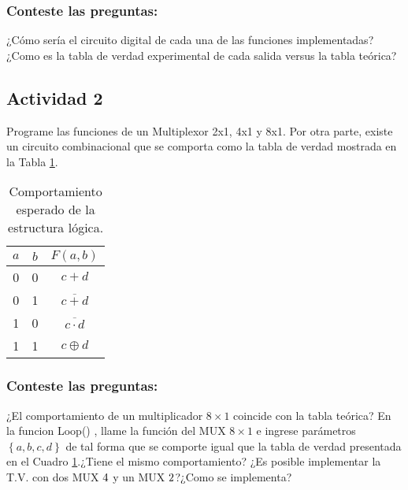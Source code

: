 \subsubsection{Conteste las preguntas:}

¿Cómo sería el circuito digital de cada una de las funciones implementadas?
¿Como es la tabla de verdad experimental de cada salida versus la tabla teórica?


\subsection{Actividad 2}

Programe las funciones de un Multiplexor 2x1, 4x1 y 8x1.
Por otra parte, existe un circuito  combinacional que se comporta como la tabla de verdad mostrada en la Tabla \ref{tab:tv}.

\begin{table}[H]
\centering
\caption{Comportamiento esperado de la estructura lógica.}
\label{tab:tv}
\begin{tabular}{ccc}
    \toprule 
    $a$ & $b$ & $F(a,b)$ \\ 
    \midrule
    0 & 0 & $c + d$ \\ 
    0 & 1 & $\overline{c + d}$ \\ 
    1 & 0 & $\overline{c \cdot d}$ \\ 
    1 & 1 & $c \oplus d$ \\ 
    \bottomrule
\end{tabular} 

\end{table}

\subsubsection{Conteste las preguntas:}

¿El comportamiento de un multiplicador $8 \times 1$ coincide con la tabla teórica?
En la funcion Loop() , llame la función del MUX  $8 \times 1$ e ingrese parámetros $\left\lbrace a,b,c,d \right\rbrace $ de tal forma que se comporte igual que la tabla de verdad presentada en el Cuadro \ref{tab:tv}.¿Tiene el mismo comportamiento?
¿Es posible implementar la T.V. con dos MUX $4 \time 1$ y un MUX  $2 \time 1$?¿Como se implementa?
